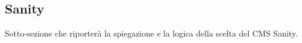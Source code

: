 \subsection{Sanity}

Sotto-sezione che riporterà la spiegazione e la logica della scelta del CMS Sanity.